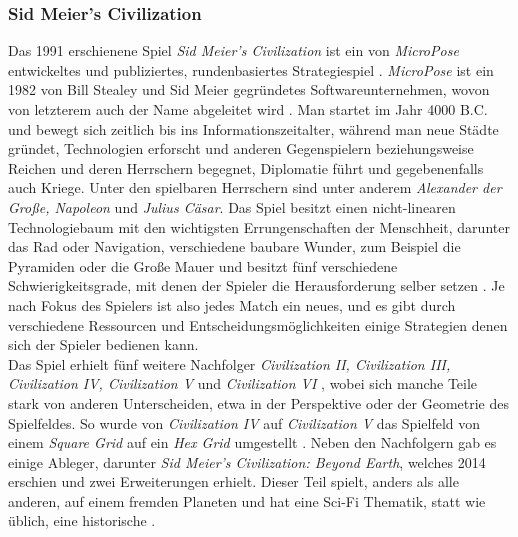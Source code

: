 \subsubsection{Sid Meier's Civilization}
Das 1991 erschienene Spiel \textit{Sid Meier's Civilization} ist ein von \textit{MicroPose} entwickeltes und publiziertes, rundenbasiertes Strategiespiel \cite*[]{civigdb}. \textit{MicroPose} ist ein 1982 von Bill Stealey und Sid Meier gegründetes Softwareunternehmen, wovon von letzterem auch der Name abgeleitet wird \cite*[]{civhistory}. Man startet im Jahr 4000 B.C. und bewegt sich zeitlich bis ins Informationszeitalter, während man neue Städte gründet, Technologien erforscht und anderen Gegenspielern beziehungsweise Reichen und deren Herrschern begegnet, Diplomatie führt und gegebenenfalls auch Kriege. Unter den spielbaren Herrschern sind unter anderem \textit{Alexander der Große, Napoleon} und \textit{Julius Cäsar}. Das Spiel besitzt einen nicht-linearen Technologiebaum mit den wichtigsten Errungenschaften der Menschheit, darunter das Rad oder Navigation, verschiedene baubare Wunder, zum Beispiel die Pyramiden oder die Große Mauer und besitzt fünf verschiedene Schwierigkeitsgrade, mit denen der Spieler die Herausforderung selber setzen \cite*[]{civ}. Je nach Fokus des Spielers ist also jedes Match ein neues, und es gibt durch verschiedene Ressourcen und Entscheidungsmöglichkeiten einige Strategien denen sich der Spieler bedienen kann. \\
Das Spiel erhielt fünf weitere Nachfolger \textit{Civilization II, Civilization III, Civilization IV, Civilization V} und \textit{Civilization VI} \cite*[]{civall}, wobei sich manche Teile stark von anderen Unterscheiden, etwa in der Perspektive oder der Geometrie des Spielfeldes. So wurde von \textit{Civilization IV} auf \textit{Civilization V} das Spielfeld von einem \textit{Square Grid} auf ein \textit{Hex Grid} umgestellt \cite*[]{civallcompare}. Neben den Nachfolgern gab es einige Ableger, darunter \textit{Sid Meier's Civilization: Beyond Earth}, welches 2014 erschien und zwei Erweiterungen erhielt. Dieser Teil spielt, anders als alle anderen, auf einem fremden Planeten und hat eine Sci-Fi Thematik, statt wie üblich, eine historische \cite*[]{civbe}.



